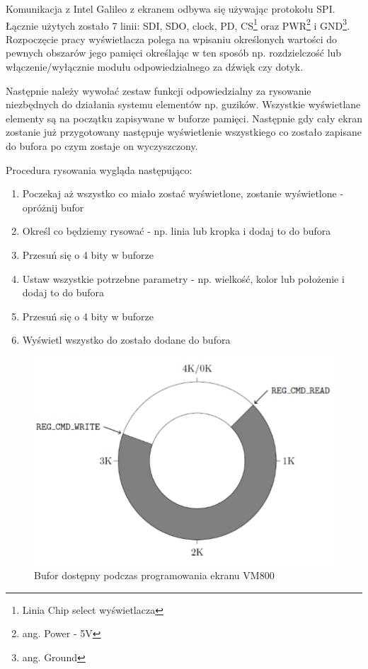 \documentclass{xmgr}
\begin{document}
Komunikacja z Intel Galileo z ekranem odbywa się używając protokołu SPI. Łącznie użytych zostało 7 linii: SDI, SDO, clock, PD, CS\footnote{Linia Chip select wyświetlacza} oraz PWR\footnote{ang. Power - 5V} i GND\footnote{ang. Ground}. Rozpoczęcie pracy wyświetlacza polega na wpisaniu określonych wartości do pewnych obszarów jego pamięci określając w ten sposób np. rozdzielczość lub włączenie/wyłącznie modułu odpowiedzialnego za dźwięk czy dotyk. 

Następnie należy wywołać zestaw funkcji odpowiedzialny za rysowanie niezbędnych do działania systemu elementów np. guzików. Wszystkie wyświetlane elementy są na początku zapisywane w buforze pamięci. Następnie gdy cały ekran zostanie już przygotowany następuje wyświetlenie wszystkiego co zostało zapisane do bufora po czym zostaje on wyczyszczony.

Procedura rysowania wygląda następująco:
\begin{enumerate}
	\item Poczekaj aż wszystko co miało zostać wyświetlone, zostanie wyświetlone - opróżnij bufor
	\item Określ co będziemy rysować - np. linia lub kropka i dodaj to do bufora
	\item Przesuń się o 4 bity w buforze
	\item Ustaw wszystkie potrzebne parametry - np. wielkość, kolor lub położenie  i dodaj to do bufora
	\item Przesuń się o 4 bity w buforze
	\item Wyświetl wszystko do zostało dodane do bufora 
\end{enumerate}

\begin{figure}[!h]
    \centering
    \includegraphics[height=0.25\textheight]{images/buf.png}
    \caption{Bufor dostępny podczas programowania ekranu VM800}
\end{figure}
\end{document}
